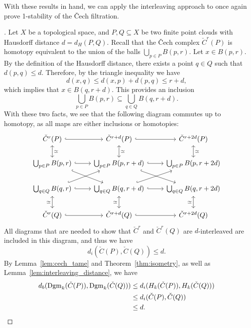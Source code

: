 With these results in hand, we can apply the interleaving approach to once again
prove 1-stability of the \v{C}ech filtration.
\begin{proof}[\cite{schnider2024introduction}]
    Let $X$ be a topological space, and $P, Q \subseteq X$ be two finite
    point clouds with Hausdorff distance $d = d_H(P, Q)$.
    Recall that the \v{C}ech complex $\check{C}^r(P)$ is homotopy equivalent
    to the union of the balls $\bigcup_{p \in P} B(p, r)$.
    Let $x \in B(p, r)$. By the definition of the Hausdorff distance, there exists
    a point $q \in Q$ such that $d(p, q) \leq d$. Therefore, by the triangle
    inequality we have
    \begin{equation}
        d(x, q) \leq d(x, p) + d(p, q) \leq r + d,
    \end{equation}
    which implies that $x \in B(q, r + d)$. This provides an inclusion
    \begin{equation}
        \bigcup_{p \in P} B(p, r) \subseteq \bigcup_{q \in Q} B(q, r + d).
    \end{equation}
    With these two facts, we see that the following diagram commutes up to
    homotopy, as all maps are either inclusions or homotopies:
    \begin{equation}
        \begin{tikzcd}
            \check{C}^r(P) \arrow[hook]{r} \arrow[leftrightarrow]{d}{\simeq}
            & \check{C}^{r + d}(P) \arrow[hook]{r} \arrow[leftrightarrow]{d}{\simeq}
            & \check{C}^{r + 2d}(P) \arrow[leftrightarrow]{d}{\simeq} \\
            \bigcup_{p \in P} B(p, r) \arrow[hook]{r} \arrow[hook]{dr}
            & \bigcup_{p \in P} B(p, r + d) \arrow[hook]{r} \arrow[hook]{dr}
            & \bigcup_{p \in P} B(p, r + 2d) \\
            \bigcup_{q \in Q} B(q, r) \arrow[hook]{r} \arrow[hook]{ur}
            & \bigcup_{q \in Q} B(q, r + d) \arrow[hook]{r} \arrow[hook]{ur}
            & \bigcup_{q \in Q} B(q, r + 2d) \\
            \check{C}^r(Q) \arrow[hook]{r} \arrow[leftrightarrow]{u}{\simeq}
            & \check{C}^{r + d}(Q) \arrow[hook]{r} \arrow[leftrightarrow]{u}{\simeq}
            & \check{C}^{r + 2d}(Q) \arrow[leftrightarrow]{u}{\simeq}
        \end{tikzcd}
    \end{equation}
    All diagrams that are needed to show that $\check{C}^r$ and $\check{C}^r(Q)$ are
    $d$-interleaved are included in this diagram, and thus we have
    \begin{equation}
        d_i(\check{C}(P), \check{C}(Q)) \leq d.
    \end{equation}
    By Lemma~\ref{lem:cech_tame} and Theorem~\ref{thm:isometry}, as well as
    Lemma~\ref{lem:interleaving_distance}, we have
    \begin{align}
        d_b(\operatorname{Dgm}_k(\check{C}(P)), \operatorname{Dgm}_k(\check{C}(Q)))
        & \leq d_i(H_k(\check{C}(P)), H_k(\check{C}(Q))) \\
        & \leq d_i(\check{C}(P), \check{C}(Q)) \\
        & \leq d.
    \end{align}
\end{proof}